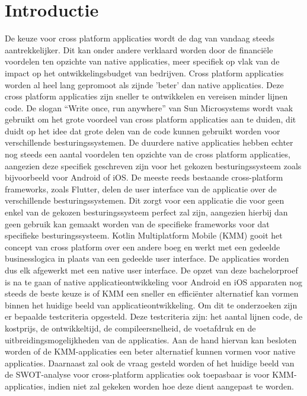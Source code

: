 
\section{Introductie} %
\label{sec:introductie}


De keuze voor cross platform applicaties wordt de dag van vandaag steeds aantrekkelijker. Dit kan onder andere verklaard worden door de financiële voordelen ten opzichte van native applicaties, meer specifiek op vlak van de impact op het ontwikkelingsbudget van bedrijven.  Cross platform applicaties worden al heel lang gepromoot als zijnde 'beter' dan native applicaties. Deze cross platform applicaties zijn sneller te ontwikkelen en vereisen minder lijnen code. De slogan “Write once, run anywhere” van Sun Microsystems \autocite{Oracle} wordt vaak gebruikt om het grote voordeel van cross platform applicaties aan te duiden, dit duidt op het idee dat grote delen van de code kunnen gebruikt worden voor verschillende besturingssystemen. De duurdere native applicaties hebben echter nog steeds een aantal voordelen ten opzichte van de cross platform applicaties, aangezien deze specifiek geschreven zijn voor het gekozen besturingssysteem zoals bijvoorbeeld voor Android of iOS. De meeste reeds bestaande cross-platform frameworks, zoals Flutter, delen de user interface van de applicatie over de verschillende besturingssystemen. Dit zorgt voor een applicatie die voor geen enkel van de gekozen besturingssysteem perfect zal zijn, aangezien hierbij dan geen gebruik kan gemaakt worden van de specifieke frameworks voor dat specifieke besturingssysteem. Kotlin Multiplatform Mobile (KMM) gooit het concept van cross platform over een andere boeg en werkt met een gedeelde businesslogica in plaats van een gedeelde user interface. De applicaties worden dus elk afgewerkt met een native user interface. De opzet van deze bachelorproef is na te gaan of native applicatieontwikkeling voor Android en iOS apparaten nog steeds de beste keuze is of KMM een sneller en efficiënter alternatief kan vormen binnen het huidige beeld van applicatieontwikkeling. Om dit te onderzoeken zijn er bepaalde testcriteria opgesteld. Deze testcriteria zijn: het aantal lijnen code, de kostprijs, de ontwikkeltijd, de compileersnelheid, de voetafdruk en de uitbreidingsmogelijkheden van de applicaties.  Aan de hand hiervan kan besloten worden of de KMM-applicaties een beter alternatief kunnen vormen voor native applicaties. Daarnaast zal ook de vraag gesteld worden of het huidige beeld van de SWOT-analyse voor cross-platform applicaties ook toepasbaar is voor KMM-applicaties, indien niet zal gekeken worden hoe deze dient aangepast te worden. 

